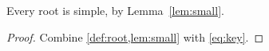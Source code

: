 \begin{theorem}[Main]\label{thm:main}
Every root is simple, by Lemma~\ref{lem:small}.
\end{theorem}
\begin{proof}
Combine \cref{def:root,lem:small} with \eqref{eq:key}.
\end{proof}

